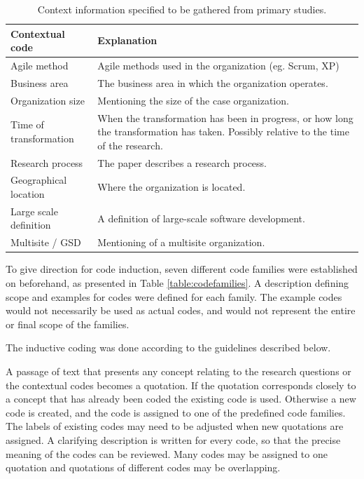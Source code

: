 \begin{table}[h]
    \centering
    \begin{tabular}{ >{\raggedright\arraybackslash}p{}
                     >{\raggedright\arraybackslash}p{} }
        \toprule
        Contextual code     & Explanation   \\
        \midrule

Agile method & Agile methods used in the organization (eg. Scrum, XP) \\

Business area & The business area in which the organization operates. \\

Organization size & Mentioning the size of the case organization. \\

Time of transformation & When the transformation has been in
progress, or how long the transformation has taken. Possibly relative to
the time of the research. \\

Research process & The paper describes a research process. \\

Geographical location & Where the organization is located. \\

Large scale definition & A definition of large-scale software development. \\

Multisite / GSD & Mentioning of a multisite organization. \\

        \bottomrule
    \end{tabular}
    \caption{Context information specified to be gathered from primary studies.}
    \label{table:contextualcodes}
\end{table}

To give direction for code induction, seven different code families were
established on beforehand, as presented in Table \ref{table:codefamilies}. A
description defining scope and examples for codes were defined for each family.
The example codes would not necessarily be used as actual codes, and would not
represent the entire or final scope of the families.

The inductive coding was done according to the guidelines described below.

A passage of text that presents any concept relating to the research questions
or the contextual codes becomes a quotation. If the quotation corresponds
closely to a concept that has already been coded the existing code is used.
Otherwise a new code is created, and the code is assigned to one of the
predefined code families. The labels of existing codes may need to be adjusted
when new quotations are assigned. A clarifying description is written for every
code, so that the precise meaning of the codes can be reviewed. Many codes may
be assigned to one quotation and quotations of different codes may be
overlapping.

